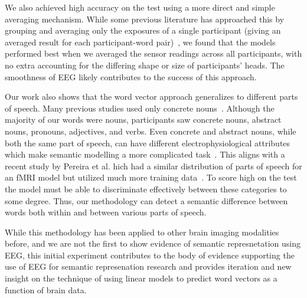 We also achieved high accuracy on the \tvt test using a more direct and simple 
averaging mechanism. While some previous literature has approached this by 
grouping and averaging only the exposures of a single participant (giving an 
averaged result for each participant-word pair)~\cite{Mitchell2008,Sudre2012}, 
we found that the models performed best when we averaged the sensor readings 
across all participants, with no extra accounting for the differing shape or 
size of participants' heads. The smoothness of EEG likely contributes to the 
success of this approach.

Our work also shows that the word vector approach generalizes to different 
parts of speech. Many previous studies used only concrete 
nouns~\cite{Mitchell2008,Sudre2012,Murphy2009}. Although the majority of our 
words were nouns, participants saw concrete nouns, abstract nouns, pronouns, 
adjectives, and verbs. Even concrete and abstract nouns, while both the same 
part of speech, can have different electrophysiological attributes which make 
semantic modelling a more complicated task~\cite{barber2013concreteness}. This 
aligns with a recent study by Pereira et al.  hich had a similar distribution 
of parts of speech for an fMRI model but utilized much more training 
data~\cite{pereira2018toward}. To score high on the \tvt test the model must be 
able to discriminate effectively between these categories to some degree. Thus, 
our methodology can detect a semantic difference between words both within and 
between various parts of speech.

While this methodology has been applied to other brain imaging modalities 
before, and we are not the first to show evidence of semantic represnetation 
using EEG, this initial experiment contributes to the body of evidence 
supporting the use of EEG for semantic represenation research and provides 
iteration and new insight on the technique of using linear models to predict 
word vectors as a function of brain data.
